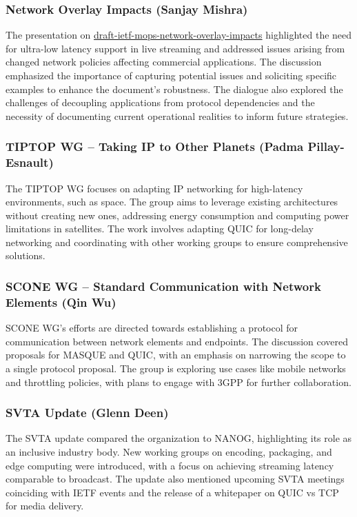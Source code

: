 \documentclass{article}
\begin{document}
\subsubsection{Network Overlay Impacts (Sanjay Mishra)}

The presentation on \href{https://datatracker.ietf.org/doc/html/draft-ietf-mops-network-overlay-impacts}{draft-ietf-mops-network-overlay-impacts} highlighted the need for ultra-low latency support in live streaming and addressed issues arising from changed network policies affecting commercial applications. The discussion emphasized the importance of capturing potential issues and soliciting specific examples to enhance the document's robustness. The dialogue also explored the challenges of decoupling applications from protocol dependencies and the necessity of documenting current operational realities to inform future strategies.

\subsubsection{TIPTOP WG -- Taking IP to Other Planets (Padma Pillay-Esnault)}

The TIPTOP WG focuses on adapting IP networking for high-latency environments, such as space. The group aims to leverage existing architectures without creating new ones, addressing energy consumption and computing power limitations in satellites. The work involves adapting QUIC for long-delay networking and coordinating with other working groups to ensure comprehensive solutions.

\subsubsection{SCONE WG -- Standard Communication with Network Elements (Qin Wu)}

SCONE WG's efforts are directed towards establishing a protocol for communication between network elements and endpoints. The discussion covered proposals for MASQUE and QUIC, with an emphasis on narrowing the scope to a single protocol proposal. The group is exploring use cases like mobile networks and throttling policies, with plans to engage with 3GPP for further collaboration.

\subsubsection{SVTA Update (Glenn Deen)}

The SVTA update compared the organization to NANOG, highlighting its role as an inclusive industry body. New working groups on encoding, packaging, and edge computing were introduced, with a focus on achieving streaming latency comparable to broadcast. The update also mentioned upcoming SVTA meetings coinciding with IETF events and the release of a whitepaper on QUIC vs TCP for media delivery.
\end{document}
